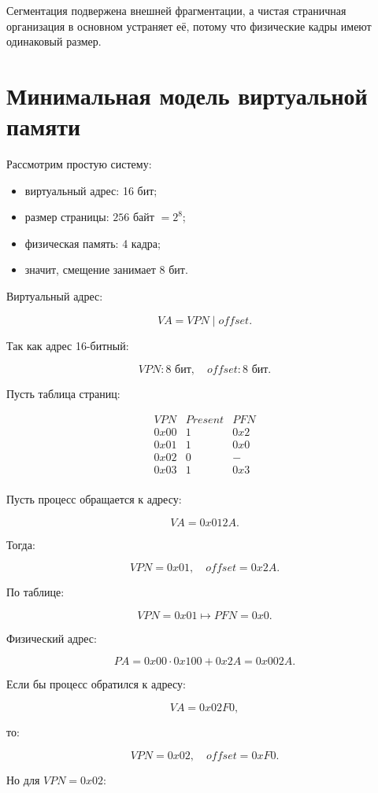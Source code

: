 \documentclass[a4paper,12pt]{article}
\begin{document}
Сегментация подвержена внешней фрагментации, а чистая страничная организация в основном устраняет её, потому что физические кадры имеют одинаковый размер.

\section{Минимальная модель виртуальной памяти}

Рассмотрим простую систему:

\begin{itemize}
    \item виртуальный адрес: 16 бит;
    \item размер страницы: $256$ байт $=2^8$;
    \item физическая память: 4 кадра;
    \item значит, смещение занимает 8 бит.
\end{itemize}

Виртуальный адрес:

\[
VA = VPN \;|\; offset.
\]

Так как адрес 16-битный:

\[
VPN: 8 \text{ бит},\quad offset: 8 \text{ бит}.
\]

Пусть таблица страниц:

\[
\begin{array}{c|c|c}
VPN & Present & PFN \\
\hline
0x00 & 1 & 0x2 \\
0x01 & 1 & 0x0 \\
0x02 & 0 & - \\
0x03 & 1 & 0x3 \\
\end{array}
\]

Пусть процесс обращается к адресу:

\[
VA = 0x012A.
\]

Тогда:

\[
VPN = 0x01,\quad offset = 0x2A.
\]

По таблице:

\[
VPN=0x01 \mapsto PFN=0x0.
\]

Физический адрес:

\[
PA = 0x00 \cdot 0x100 + 0x2A = 0x002A.
\]

Если бы процесс обратился к адресу:

\[
VA = 0x02F0,
\]

то:

\[
VPN = 0x02,\quad offset = 0xF0.
\]

Но для $VPN=0x02$:
\end{document}
